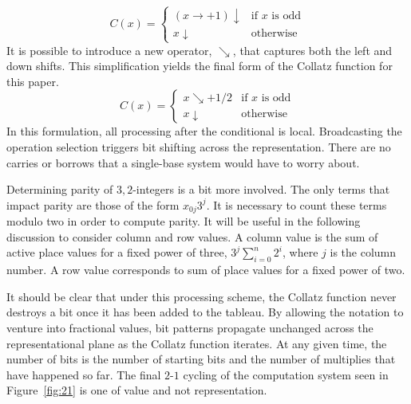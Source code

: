 \documentclass{article}
\begin{document}
\begin{equation}
  C(x) = \begin{cases}
    (x\rightarrow + 1)\downarrow & \text{if } x \text{ is odd}\\
    x\downarrow & \text{otherwise}
    \end{cases}
\end{equation}
It is possible to introduce a new operator, $\searrow$, that captures both the left and
down shifts. This simplification yields the final form of the Collatz function for this paper.
\begin{equation}
  C(x) = \begin{cases}
    x\searrow + 1/2 & \text{if } x \text{ is odd}\\
    x\downarrow & \text{otherwise}
  \end{cases}
  \label{eqn:c}
\end{equation}
In this formulation, all processing after the conditional is local. Broadcasting the
operation selection triggers bit shifting across the representation. There are no carries
or borrows that a single-base system would have to worry about.

Determining parity of ${3,2}$-integers is a bit more involved. The only terms that impact
parity are those of the form $x_{0j}3^j$. It is necessary to count these terms modulo two
in order to compute parity. It will be useful in the following discussion to consider
column and row values. A column value is the sum of active place values for a fixed power of
three, $3^j\sum_{i=0}^{n}2^i$, where $j$ is the column number. A row value corresponds to
sum of place values for a fixed power of two.

It should be clear that under this processing scheme, the Collatz function
never destroys a bit once it has been added to the tableau. By allowing the
notation to venture into fractional values, bit patterns propagate unchanged
across the representational plane as the Collatz function iterates.  At any
given time, the number of bits is the number of starting bits and the number of
multiplies that have happened so far. The final $2$-$1$ cycling of the computation
system seen in Figure~\ref{fig:21} is one of value and not representation.
\end{document}
